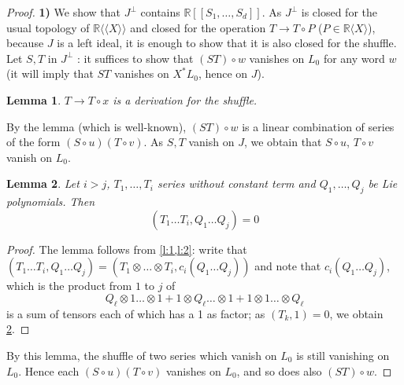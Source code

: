 \documentclass[a4paper,12pt]{article}
\newtheorem{lemma}{Lemma}
\newcommand{\R}{\mathbb{R}}
\newcommand{\Rx}{\R\langle X\rangle}
\newcommand{\Rxx}{\R\langle\langle X\rangle\rangle}
\begin{document}
\begin{proof}
	\textbf{1)} We show that $J^\perp$ contains $\R[[S_1,\dotsc,S_d]]$.
	As $J^\perp$ is closed for the usual topology of $\Rxx$ and closed for the operation $T \rightarrow T \circ P$ ($P \in \Rx$), because $J$ is a left ideal, it is enough to show that it is also closed for the shuffle. Let ${S}, {T}$ in ${J}^{\perp}$ : it suffices to show that $({ST}) \circ w$ vanishes on ${L}_0$ for any word ${w}$ (it will imply that ${ST}$ vanishes on ${X}^* L_0$, hence on ${J}$).
	
	\begin{lemma} \label{l:3}
		$T \rightarrow T \circ x$ is a derivation for the shuffle.
	\end{lemma}

	By the lemma (which is well-known), $({ST}) \circ {w}$ is a linear combination of series of the form $(S \circ u)(T \circ v)$. As $S, T$ vanish on $J$, we obtain that $S\circ u$, $T\circ v$ vanish on ${L}_0$.
	
	\begin{lemma} \label{l:4}
		Let $i > j$, $T_1, \ldots, T_i$ series without constant term and $Q_1, \ldots, Q_j$ be	Lie polynomials. Then
		\begin{equation*}
			\left(T_1 \ldots T_i, Q_1 \ldots Q_j\right)=0
		\end{equation*}
	\end{lemma}

	\begin{proof}
		The lemma follows from \cref{l:1,l:2}: write that $\left({T}_1 \ldots {T}_i,Q_1 \ldots Q_j\right)=\left(T_1 \otimes \ldots \otimes T_i, c_i\left(Q_1 \ldots Q_j\right)\right)$ and note that $c_i\left(Q_1 \ldots Q_j\right)$, which is the product from $1$ to $j$ of
		\begin{equation*}
			{Q}_{\ell} \otimes 1 \ldots \otimes 1+1 \otimes {Q}_{\ell} \ldots \otimes 1+1 \otimes 1 \ldots \otimes {Q}_{\ell}
		\end{equation*}
		is a sum of tensors each of which has a 1 as factor; as $\left(T_k, 1\right)=0$, we obtain \cref{l:4}.
	\end{proof}

	By this lemma, the shuffle of two series which vanish on ${L}_0$ is still vanishing on ${L}_0$. Hence each $({S} \circ {u})({T} \circ {v})$ vanishes on ${L}_0$, and so does also $(ST) \circ w$.
	
	\bigskip	
	

\end{proof}
\end{document}
